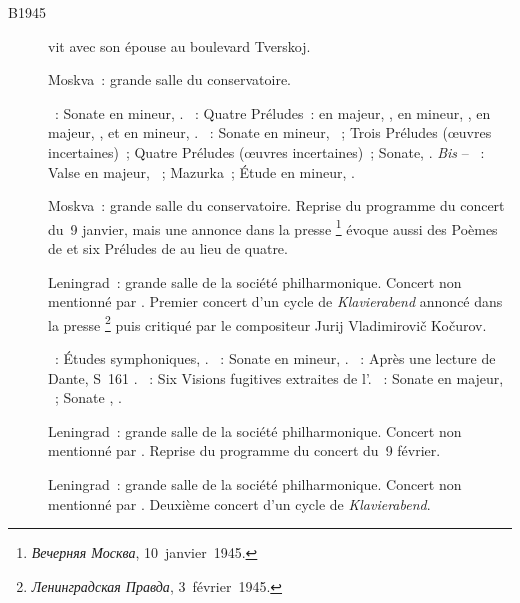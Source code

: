 \begin{description}
 \item[B1945]
 \VSofronitsky{} vit avec son épouse \VDushinova{} au boulevard Tverskoj.
 \item[]
 Moskva~: grande salle du conservatoire.

 \textsc{\Glazounov{}}~: Sonate en \kB \Flat mineur, .
 \textsc{\Rachmaninov{}}~: Quatre Préludes~: en \kC majeur, 
 , en \kA mineur,  , en \kG majeur, 
 , et en \kB \Flat mineur,  .
 \textsc{\Scriabine{}}~: Sonate en \kF \Sharp mineur, ~; Trois
 Préludes (œuvres incertaines)~; Quatre Préludes (œuvres incertaines)~;
 Sonate, .
 \emph{Bis} -- \textsc{\Scriabine{}}~: Valse en \kA \Flat majeur,
 ~; Mazurka~; Étude en \kD \Sharp mineur,  .
 \item[]
 Moskva~: grande salle du conservatoire.
 Reprise du programme du concert du~9 janvier, mais une annonce dans la
 presse%
 \footnote{\foreignlanguage{russian}{\emph{Вечерняя Москва}},
 10~janvier~1945.}
 évoque aussi des Poèmes de \Scriabine{} et six Préludes de \Rachmaninov{}
 au lieu de quatre.
 \item[]
 Leningrad~: grande salle de la société philharmonique.
 Concert non mentionné par \citet[p.~423]{Scriabine}.
 Premier concert d'un cycle de \foreignlanguage{german}{\emph{Klavierabend}}
 annoncé dans la presse%
 \footnote{\foreignlanguage{russian}{\emph{Ленинградская Правда}},
 3~février~1945.}
 puis critiqué par le compositeur Jurij Vladimirovič Kočurov.

 \textsc{\Schumann{}}~: Études symphoniques, .
 \textsc{\Chopin{}}~: Sonate en \kB \Flat mineur, .
 \textsc{\Liszt{}}~: Après une lecture de Dante, S~161 .
 \textsc{\Prokofiev{}}~: Six Visions fugitives extraites de l'.
 \textsc{\Scriabine{}}~: Sonate  en \kF \Sharp majeur, ~;
 Sonate , .
 \item[]
 Leningrad~: grande salle de la société philharmonique.
 Concert non mentionné par \citet[p.~423]{Scriabine}.
 Reprise du programme du concert du~9 février.
 \item[]
 Leningrad~: grande salle de la société philharmonique.
 Concert non mentionné par \citet[p.~423]{Scriabine}.
 Deuxième concert d'un cycle de
 \foreignlanguage{german}{\emph{Klavierabend}}.


\end{description}
